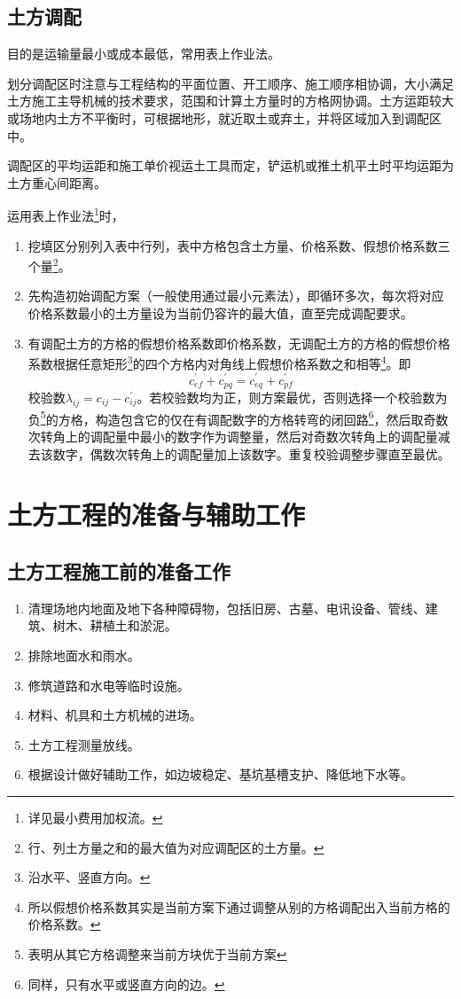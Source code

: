 \documentclass{book}
\begin{document}
\subsection{土方调配}
\par 目的是运输量最小或成本最低，常用表上作业法。
\par 划分调配区时注意与工程结构的平面位置、开工顺序、施工顺序相协调，大小满足土方施工主导机械的技术要求，范围和计算土方量时的方格网协调。土方运距较大或场地内土方不平衡时，可根据地形，就近取土或弃土，并将区域加入到调配区中。
\par 调配区的平均运距和施工单价视运土工具而定，铲运机或推土机平土时平均运距为土方重心间距离。
\par 运用表上作业法\footnote{详见最小费用加权流。}时，
\begin{enumerate}
    \item 挖填区分别列入表中行列，表中方格包含土方量、价格系数、假想价格系数三个量\footnote{行、列土方量之和的最大值为对应调配区的土方量。}。
    \item 先构造初始调配方案（一般使用通过最小元素法），即循环多次，每次将对应价格系数最小的土方量设为当前仍容许的最大值，直至完成调配要求。
    \item 有调配土方的方格的假想价格系数即价格系数，无调配土方的方格的假想价格系数根据任意矩形\footnote{沿水平、竖直方向。}的四个方格内对角线上假想价格系数之和相等\footnote{所以假想价格系数其实是当前方案下通过调整从别的方格调配出入当前方格的价格系数。}。即
          $$
              c_{ef}^{\prime} + c_{pq}^{\prime} = c_{eq}^{\prime} + c_{pf}^{\prime}
          $$
          校验数$\lambda_{ij} = c_{ij} - c_{ij}^{\prime}$。若校验数均为正，则方案最优，否则选择一个校验数为负\footnote{表明从其它方格调整来当前方块优于当前方案}的方格，构造包含它的仅在有调配数字的方格转弯的闭回路\footnote{同样，只有水平或竖直方向的边。}，然后取奇数次转角上的调配量中最小的数字作为调整量，然后对奇数次转角上的调配量减去该数字，偶数次转角上的调配量加上该数字。重复校验调整步骤直至最优。
\end{enumerate}
\section{土方工程的准备与辅助工作}
\subsection{土方工程施工前的准备工作}
\begin{enumerate}
    \item 清理场地内地面及地下各种障碍物，包括旧房、古墓、电讯设备、管线、建筑、树木、耕植土和淤泥。
    \item 排除地面水和雨水。
    \item 修筑道路和水电等临时设施。
    \item 材料、机具和土方机械的进场。
    \item 土方工程测量放线。
    \item 根据设计做好辅助工作，如边坡稳定、基坑基槽支护、降低地下水等。
\end{enumerate}
\end{document}
